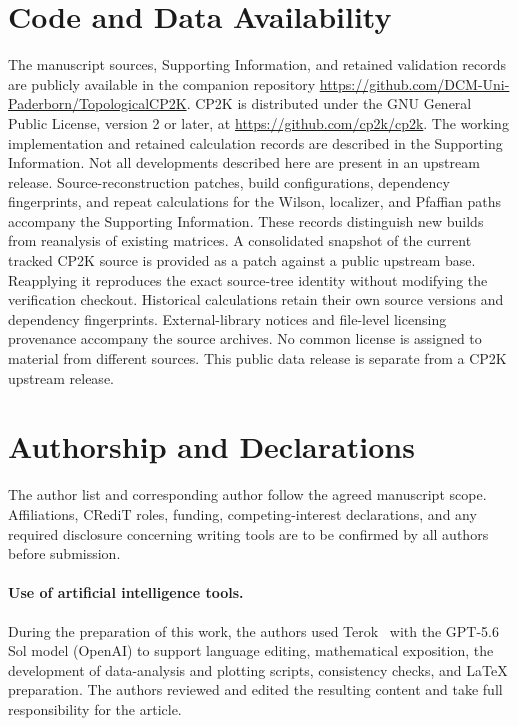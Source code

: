 \documentclass[11pt]{article}
\newcommand{\CPtwoK}{\textsc{CP2K}}
\numberwithin{equation}{section}
\begin{document}
\section*{Code and Data Availability}
The manuscript sources, Supporting Information, and retained validation
records are publicly available in the companion repository
\url{https://github.com/DCM-Uni-Paderborn/TopologicalCP2K}.
\CPtwoK{} is distributed under the GNU General Public License, version
2 or later, at \url{https://github.com/cp2k/cp2k}. The working implementation
and retained calculation records are described in the Supporting
Information. Not all developments described here are present in an
upstream release. Source-reconstruction patches, build configurations,
dependency fingerprints, and repeat calculations for the Wilson,
localizer, and Pfaffian paths accompany the Supporting Information.
These records distinguish new builds from reanalysis of existing matrices.
A consolidated snapshot of the current tracked \CPtwoK{} source is
provided as a patch against a public upstream base. Reapplying it
reproduces the exact source-tree identity without modifying the
verification checkout. Historical calculations retain their own source
versions and dependency fingerprints. External-library notices and
file-level licensing provenance accompany the source archives. No common
license is assigned to material from different sources.
This public data release is separate from a \CPtwoK{} upstream release.

\section*{Authorship and Declarations}
The author list and corresponding author follow the agreed manuscript
scope. Affiliations, CRediT roles, funding, competing-interest declarations,
and any required disclosure concerning writing tools are to be confirmed
by all authors before submission.
\paragraph{Use of artificial intelligence tools.}
During the preparation of this work, the authors used Terok~\cite{Vyskocil2026Terok} with the GPT-5.6 Sol model (OpenAI) to support language editing, mathematical exposition, the development of data-analysis and plotting scripts, consistency checks, and LaTeX preparation. The authors reviewed and edited the resulting content and take full responsibility for the article.


\end{document}
